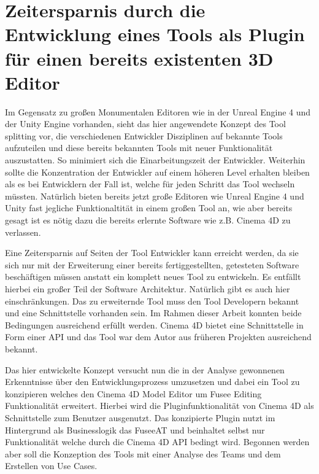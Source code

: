 \documentclass[pagesize, paper=a4, fontsize=12pt, titlepage=true, headings=small, headnosepline, abstractoff, liststotoc, nochapterprefix, plainheadsepline, twoside]{scrreprt}
\begin{document}
\section{Zeitersparnis durch die Entwicklung eines Tools als Plugin für einen bereits existenten 3D Editor}
Im Gegensatz zu großen Monumentalen Editoren wie in der Unreal Engine 4 und der Unity Engine vorhanden, sieht das hier angewendete Konzept des Tool splitting vor, die verschiedenen Entwickler Disziplinen auf bekannte Tools aufzuteilen und diese bereits bekannten Tools mit neuer Funktionalität auszustatten. So minimiert sich die Einarbeitungszeit der Entwickler. Weiterhin sollte die Konzentration der Entwickler auf einem höheren Level erhalten bleiben als es bei Entwicklern der Fall ist, welche für jeden Schritt das Tool wechseln müssten. Natürlich bieten bereits jetzt große Editoren wie Unreal Engine 4 und Unity fast jegliche Funktionaltität in einem großen Tool an, wie aber bereits gesagt ist es nötig dazu die bereits erlernte Software wie z.B. Cinema 4D zu verlassen.

Eine Zeitersparnis auf Seiten der Tool Entwickler kann erreicht werden, da sie sich nur mit der Erweiterung einer bereits fertiggestellten, getesteten Software beschäftigen müssen anstatt ein komplett neues Tool zu entwickeln. Es entfällt hierbei ein großer Teil der Software Architektur. Natürlich gibt es auch hier einschränkungen. Das zu erweiternde Tool muss den Tool Developern bekannt und eine Schnittstelle vorhanden sein. Im Rahmen dieser Arbeit konnten beide Bedingungen ausreichend erfüllt werden. Cinema 4D bietet eine Schnittstelle in Form einer API und das Tool war dem Autor aus früheren Projekten ausreichend bekannt.

Das hier entwickelte Konzept versucht nun die in der Analyse gewonnenen Erkenntnisse über den Entwicklungsprozess umzusetzen und dabei ein Tool zu konzipieren welches den Cinema 4D Model Editor um Fusee Editing Funktionalität erweitert. Hierbei wird die Pluginfunktionalität von Cinema 4D als Schnittstelle zum Benutzer ausgenutzt. Das konzipierte Plugin nutzt im Hintergrund als Businesslogik das FuseeAT und beinhaltet selbst nur Funktionalität welche durch die Cinema 4D API bedingt wird. Begonnen werden aber soll die Konzeption des Tools mit einer Analyse des Teams und dem Erstellen von Use Cases.
\end{document}
